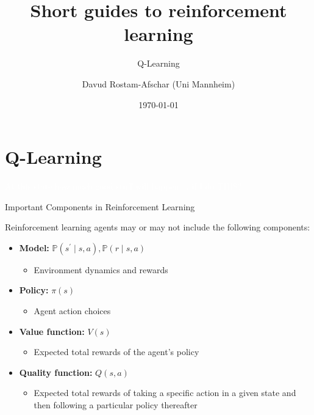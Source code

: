 \documentclass[11pt,table]{beamer}
\title[]{Short guides to reinforcement learning}
\subtitle[]{Q-Learning}
\author[D. Rostam-Afschar]{\textcolor{gray1}{Davud Rostam-Afschar (Uni Mannheim)}}
\date[]{\today}
\begin{document}
\begin{frame}[plain]
  \titlepage
\end{frame}


\section{Q-Learning}
{
\begin{frame}
\centering
\Huge
\textcolor{white}{At this state how much good stuff will happen ... if I do THIS?}
\thispagestyle{empty}
\end{frame}
}


\begin{frame}{Important	Components in Reinforcement Learning}


Reinforcement learning agents may or may not include the following components:
\vspace{3mm}

\begin{itemize}
    \item \textcolor{red1}{\textbf{Model:}} $\mathbb{P}\left(s^{\prime} \mid s, a\right), \mathbb{P}(r \mid s, a)$
\begin{itemize}

\item  Environment dynamics and rewards
\end{itemize}
\item \textcolor{red1}{\textbf{Policy:}} $\pi(s)$

\begin{itemize} 
\item Agent action choices
\end{itemize}
\item \textcolor{red1}{\textbf{Value function:}} $V(s)$

\begin{itemize}
\item  Expected total rewards of the agent's policy 
\end{itemize}
\pause
\item \textcolor{red1}{\textbf{Quality function:}} $Q(s,a)$

\begin{itemize}
\item  Expected total rewards of taking a specific action in a given state and then following a particular policy thereafter
\end{itemize}
\end{itemize}
    
\end{frame}
\end{document}
